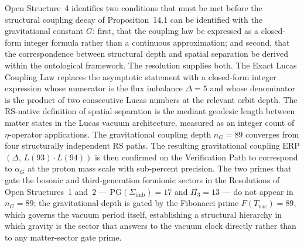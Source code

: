 \documentclass[11pt, letterpaper]{article}
\theoremstyle{definition}
\theoremstyle{plain}
\begin{document}
Open Structure~4 identifies two conditions that must be met before the structural
coupling decay of Proposition~14.1 can be identified with the gravitational constant $G$:
first, that the coupling law be expressed as a closed-form integer formula rather
than a continuous approximation; and second, that the correspondence between structural depth
and spatial separation be derived within the ontological framework. The resolution
supplies both. The Exact Lucas Coupling Law replaces the asymptotic statement with
a closed-form integer expression whose numerator is the flux imbalance $\Delta = 5$
and whose denominator is the product of two consecutive Lucas numbers at the relevant
orbit depth. The RS-native definition of spatial separation is the mediant geodesic
length between matter states in the Lucas vacuum architecture, measured as an integer
count of $\eta$-operator applications. The gravitational coupling depth $n_G = 89$
converges from four structurally independent RS paths. The resulting gravitational
coupling ERP $(\Delta,\, L(93) \cdot L(94))$ is then confirmed on the Verification Path
to correspond to $\alpha_G$ at the proton mass scale with sub-percent precision. The two
primes that gate the bosonic and third-generation fermionic sectors in the Resolutions
of Open Structures~1 and~2 — $\mathrm{PG}(\Sigma_\mathrm{imb}) = 17$ and $\Pi_3 = 13$ —
do not appear in $n_G = 89$; the gravitational depth is gated by the Fibonacci prime
$F(T_\mathrm{vac}) = 89$, which governs the vacuum period itself, establishing a
structural hierarchy in which gravity is the sector that answers to the vacuum clock
directly rather than to any matter-sector gate prime.
\end{document}
